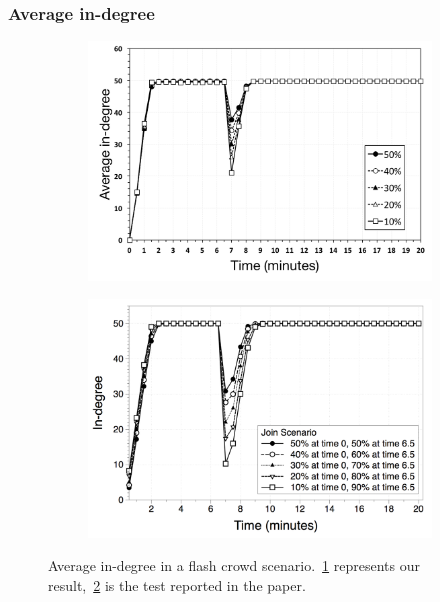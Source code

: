 \documentclass{beamer}
\begin{document}
\begin{frame}
\frametitle{Average in-degree}

\begin{figure}
\centering
\begin{subfigure}{.5\textwidth}
  \centering
  \includegraphics[keepaspectratio=true, width=1\linewidth]{images/average_indegree}
  \caption{}
  \label{fig:average_indegree}
\end{subfigure}%
\begin{subfigure}{.5\textwidth}
  \centering
  \includegraphics[keepaspectratio=true, width=1\linewidth]{images/paper_average_indegree}
  \caption{}
  \label{fig:paper_average_indegree}
\end{subfigure}
\caption{Average in-degree in a flash crowd scenario.~\ref{fig:average_indegree} represents our result,~\ref{fig:paper_average_indegree} is the test reported in the paper.}
\label{fig:robustness_indegree_flash_crowd}
\end{figure}

\end{frame}
\end{document}
